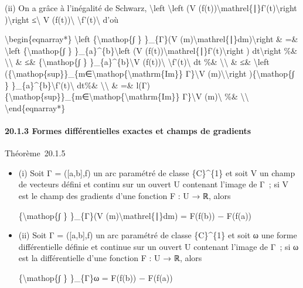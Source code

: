 \documentclass[]{article}
\begin{document}
(ii) On a grâce à l'inégalité de Schwarz, \textbackslash{}left
\textbar{}\textbackslash{}left (V
(f(t))\textbackslash{}mathrel\{∣\}f'(t)\textbackslash{}right
)\textbackslash{}right \textbar{} ≤\textbackslash{}\textbar{} V
(f(t))\textbackslash{}\textbar{}
\textbackslash{}\textbar{}f'(t)\textbackslash{}\textbar{} d'où

\textbackslash{}begin\{eqnarray*\} \textbackslash{}left
\textbar{}\{\textbackslash{}mathop\{∫ \} \}\_\{Γ\}(V
(m)\textbackslash{}mathrel\{∣\}dm)\textbackslash{}right \textbar{}\& =\&
\textbackslash{}left \textbar{}\{\textbackslash{}mathop\{∫ \}
\}\_\{a\}\^{}\{b\}\textbackslash{}left (V
(f(t))\textbackslash{}mathrel\{∣\}f'(t)\textbackslash{}right )
dt\textbackslash{}right \textbar{} \%\& \textbackslash{}\textbackslash{}
\& ≤\& \{\textbackslash{}mathop\{∫ \}
\}\_\{a\}\^{}\{b\}\textbackslash{}\textbar{}V
(f(t))\textbackslash{}\textbar{}
\textbackslash{}\textbar{}f'(t)\textbackslash{}\textbar{} dt \%\&
\textbackslash{}\textbackslash{} \& ≤\& \textbackslash{}left
(\{\textbackslash{}mathop\{sup\}\}\_\{m∈\textbackslash{}mathop\{\textbackslash{}mathrm\{Im\}\}
Γ\}\textbackslash{}\textbar{}V
(m)\textbackslash{}\textbar{}\textbackslash{}right
)\{\textbackslash{}mathop\{∫ \}
\}\_\{a\}\^{}\{b\}\textbackslash{}\textbar{}f'(t)\textbackslash{}\textbar{}
dt\%\& \textbackslash{}\textbackslash{} \& =\&
l(Γ)\{\textbackslash{}mathop\{sup\}\}\_\{m∈\textbackslash{}mathop\{\textbackslash{}mathrm\{Im\}\}
Γ\}\textbackslash{}\textbar{}V (m)\textbackslash{}\textbar{} \%\&
\textbackslash{}\textbackslash{} \textbackslash{}end\{eqnarray*\}

\paragraph{20.1.3 Formes différentielles exactes et champs de gradients}

Théorème~20.1.5

\begin{itemize}
\item
  (i) Soit Γ = ({[}a,b{]},f) un arc paramétré de classe \{C\}\^{}\{1\}
  et soit V un champ de vecteurs défini et continu sur un ouvert U
  contenant l'image de Γ~; si V est le champ des gradients d'une
  fonction F : U → ℝ, alors

  \{\textbackslash{}mathop\{∫ \} \}\_\{Γ\}(V
  (m)\textbackslash{}mathrel\{∣\}dm) = F(f(b)) − F(f(a))
\item
  (ii) Soit Γ = ({[}a,b{]},f) un arc paramétré de classe \{C\}\^{}\{1\}
  et soit ω une forme différentielle définie et continue sur un ouvert U
  contenant l'image de Γ~; si ω est la différentielle d'une fonction F :
  U → ℝ, alors

  \{\textbackslash{}mathop\{∫ \} \}\_\{Γ\}ω = F(f(b)) − F(f(a))
\end{itemize}
\end{document}

